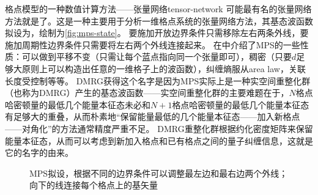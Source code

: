 \begin{back}{格点模型的一种数值计算方法——张量网络}{tensor-network}
    可能最有名的张量网络方法就是了。这是一种主要用于分析一维格点系统的张量网络方法，其基态波函数拟设为，绘制为\autoref{fig:mps-state}。
    要施加开放边界条件只需移除左右两条外线，要施加周期性边界条件只需要将左右两个外线连接起来。
    在\cite{Orus_tensor}中介绍了MPS的一些性质：可以做到平移不变（只需让每个蓝点指向同一个张量即可），稠密（只要$d$足够大原则上可以构造出任意的一维格子上的波函数），纠缠熵服从area law，关联长度受控制等等。
    DMRG获得这个名字是因为MPS实际上是一种实空间重整化群（也称为DMRG）产生的基态波函数——实空间重整化群的主要难题在于，$N$格点哈密顿量的最低几个能量本征态未必和$N+1$格点哈密顿量的最低几个能量本征态有足够大的重叠，从而朴素地“保留能量最低的几个能量本征态——加入新格点——对角化”的方法通常精度严重不足。
    DMRG重整化群根据约化密度矩阵来保留能量本征态，从而可以考虑到新加入格点和已有格点之间的量子纠缠信息，这就是它的名字的由来。
\end{back}

\begin{figure}
    \centering
    
    \caption{MPS拟设，根据不同的边界条件可以调整最左边和最右边两个外线；向下的线连接每个格点上的基矢量}
    \label{fig:mps-state}
\end{figure}
